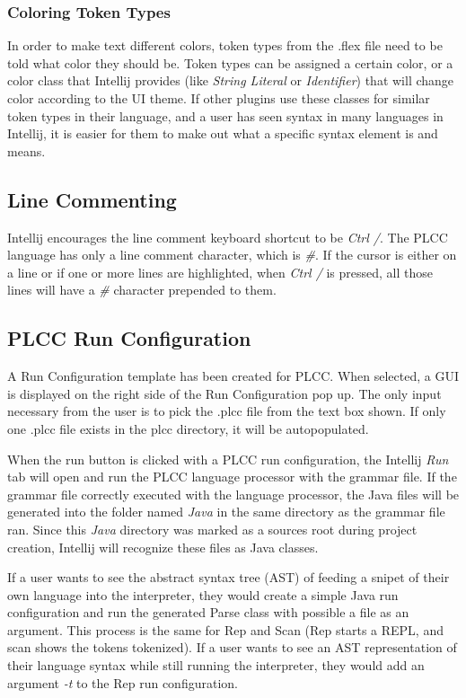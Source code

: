 \documentclass[conference, letterpaper]{IEEEtran}
\begin{document}
\subsubsection{Coloring Token Types}\label{subsubsec:coloring-token-types}
In order to make text different colors, token types from the .flex file need to be told what color they should be.
Token types can be assigned a certain color, or a color class that Intellij provides (like \textit{String Literal} or \textit{Identifier}) that will change color according to the UI theme.
If other plugins use these classes for similar token types in their language, and a user has seen syntax in many languages in Intellij, it is easier for them to make out what a specific syntax element is and means.

\subsection{Line Commenting}\label{subsec:line-commenting}
Intellij encourages the line comment keyboard shortcut to be \textit{Ctrl /}.
The PLCC language has only a line comment character, which is \textit{\#}.
If the cursor is either on a line or if one or more lines are highlighted, when \textit{Ctrl /} is pressed, all those lines will have a \textit{\#} character prepended to them.


\subsection{PLCC Run Configuration}\label{subsec:plcc-run-configuration}
A Run Configuration template has been created for PLCC\@.
When selected, a GUI is displayed on the right side of the Run Configuration pop up.
The only input necessary from the user is to pick the .plcc file from the text box shown.
If only one .plcc file exists in the plcc directory, it will be autopopulated.

When the run button is clicked with a PLCC run configuration, the Intellij \textit{Run} tab will open and run the PLCC language processor with the grammar file.
If the grammar file correctly executed with the language processor, the Java files will be generated into the folder named \textit{Java} in the same directory as the grammar file ran.
Since this \textit{Java} directory was marked as a sources root during project creation, Intellij will recognize these files as Java classes.

If a user wants to see the abstract syntax tree (AST) of feeding a snipet of their own language into the interpreter, they would create a simple Java run configuration and run the generated Parse class with possible a file as an argument.
This process is the same for Rep and Scan (Rep starts a REPL, and scan shows the tokens tokenized).
If a user wants to see an AST representation of their language syntax while still running the interpreter, they would add an argument \textit{-t} to the Rep run configuration.
\end{document}
